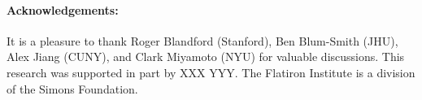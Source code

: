 \documentclass{article}
\begin{document}
\paragraph{Acknowledgements:}
It is a pleasure to thank
  Roger Blandford (Stanford),
  Ben Blum-Smith (JHU),
  Alex Jiang (CUNY), and
  Clark Miyamoto (NYU)
for valuable discussions.
This research was supported in part by XXX YYY.
The Flatiron Institute is a division of the Simons Foundation.

\raggedright


\end{document}
